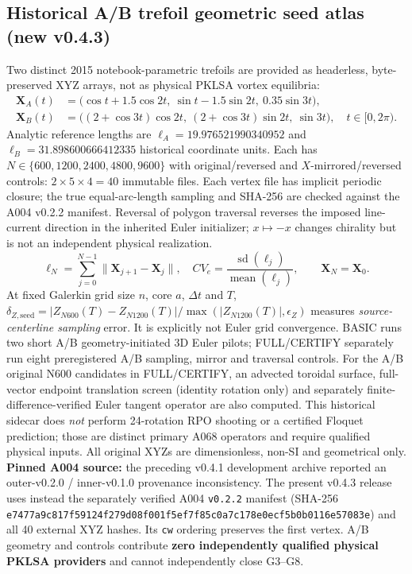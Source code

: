 \documentclass[11pt,a4paper]{article}
\begin{document}
\subsection*{Historical A/B trefoil geometric seed atlas (new v0.4.3)}
Two distinct 2015 notebook-parametric trefoils are provided as headerless,
byte-preserved XYZ arrays, not as physical PKLSA vortex equilibria:
\begin{align}
\mathbf X_A(t)&=\bigl(\cos t+1.5\cos2t,\ \sin t-1.5\sin2t,\ 0.35\sin3t\bigr),\\
\mathbf X_B(t)&=\bigl((2+\cos3t)\cos2t,\ (2+\cos3t)\sin2t,\ \sin3t\bigr),\quad t\in[0,2\pi).
\end{align}
Analytic reference lengths are $\ell_A=19.976521990340952$ and
$\ell_B=31.898600666412335$ historical coordinate units. Each has
$N\in\{600,1200,2400,4800,9600\}$ with original/reversed and
$X$-mirrored/reversed controls: $2\times5\times4=40$ immutable files.
Each vertex file has implicit periodic closure; the true equal-arc-length
sampling and SHA-256 are checked against the A004 v0.2.2 manifest. Reversal
of polygon traversal reverses the imposed line-current direction in the
inherited Euler initializer; $x\mapsto-x$ changes chirality but is not
an independent physical realization.
\begin{equation}
 \ell_N=\sum_{j=0}^{N-1}\|\mathbf X_{j+1}-\mathbf X_j\|,\quad
 CV_e=\frac{\operatorname{sd}(\ell_j)}{\operatorname{mean}(\ell_j)},
 \qquad \mathbf X_N=\mathbf X_0.
\end{equation}
At fixed Galerkin grid size $n$, core $a$, $\Delta t$ and $T$,
$\delta_{Z,\mathrm{seed}}=|Z_{N600}(T)-Z_{N1200}(T)|/
\max(|Z_{N1200}(T)|,\epsilon_Z)$ measures \emph{source-centerline sampling}
error. It is explicitly not Euler grid convergence. BASIC runs two short A/B geometry-initiated 3D Euler pilots;
FULL/CERTIFY separately run eight preregistered A/B sampling,
mirror and traversal controls. For the A/B original N600 candidates
in FULL/CERTIFY, an advected toroidal surface, full-vector endpoint
translation screen (identity rotation only) and separately
finite-difference-verified Euler tangent operator are also computed.
This historical sidecar does \emph{not} perform 24-rotation RPO
shooting or a certified Floquet prediction; those are distinct
primary A068 operators and require qualified physical inputs.
All original XYZs are dimensionless, non-SI and geometrical only.
\textbf{Pinned A004 source:} the preceding v0.4.1 development archive
reported an outer-v0.2.0 / inner-v0.1.0 provenance inconsistency.
The present v0.4.3 release uses instead the separately verified A004
\texttt{v0.2.2} manifest (SHA-256
\texttt{e7477a9c817f59124f279d08f001f5ef7f85c0a7c178e0ecf5b0b0116e57083e})
and all 40 external XYZ hashes. Its \texttt{cw} ordering preserves the
first vertex. A/B geometry and controls contribute \textbf{zero independently
qualified physical PKLSA providers} and cannot independently close G3--G8.
\end{document}
